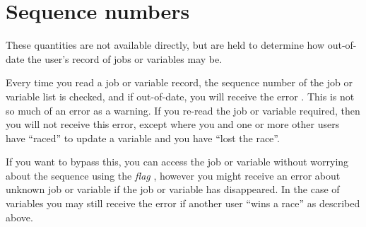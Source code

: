 \chapter{Sequence numbers}
\label{chp:sequence-numbers}
These quantities are not available directly, but are held to determine how out-of-date the user's record of jobs or variables
may be.

Every time you read a job or variable record, the sequence number of the job or variable list is checked, and if out-of-date, you will receive
the error . This is not so much of an error as a warning. If you re-read the job or variable required,
then you will not receive this error, except where you and one or more other users have ``raced'' to update a
variable and you have ``lost the race''.

If you want to bypass this, you can access the job or variable without worrying about the sequence using the \textit{flag
}, however you might receive an error about unknown job or variable if the job or variable has
disappeared. In the case of variables you may still receive the  error if another user
``wins a race'' as described above.

